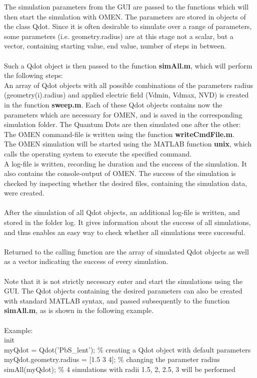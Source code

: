The simulation parameters from the GUI are passed to the functions which will then start the simulation with OMEN.
The parameters are stored in objects of the class Qdot. Since it is often desirable to simulate over a range of parameters, some parameters (i.e. geometry.radius) are at this stage not a scalar, but a vector, containing starting value, end value, number of steps in between.
\\\\
Such a Qdot object is then passed to the function \textbf{simAll.m}, which will perform the following steps:\\
An array of Qdot objects with all possible combinations of the parameters radius  (geometry(i).radius) and applied electric field (Vdmin, Vdmax, NVD) is created in the function \textbf{sweep.m}. Each of these Qdot objects contains now the parameters which are necessary for OMEN, and is saved in the corresponding simulation folder.
The Quantum Dots are then simulated one after the other: \\
The OMEN command-file is written using the function \textbf{writeCmdFile.m}.\\
The OMEN simulation will be started using the MATLAB function \textbf{unix}, which calls the operating system to execute the specified command.\\
A log-file is written, recording he duration and the success of the simulation. It also contains the console-output of OMEN. The success of the simulation is checked by inspecting whether the desired files, containing the simulation data, were created.
\\\\
After the simulation of all Qdot objects, an additional log-file is written, and stored in the folder log. It gives information about the success of all simulations, and thus enables an easy way to check whether all simulations were successful.
\\\\
Returned to the calling function are the array of simulated Qdot objects as well as a vector indicating the success of every simulation.
\\\\
Note that it is not strictly necessary enter and start the simulations using the GUI. The Qdot objects containing the desired parameters can also be created with standard MATLAB syntax, and passed subsequently to the function \textbf{simAll.m}, as is shown in the following example.\\
\\
Example: \\
init\\
myQdot = Qdot('PbS\_lent'); \% creating a Qdot object with default parameters \\
myQdot.geometry.radius = [1.5 3 4]; \% changing the parameter radius\\
simAll(myQdot); \% 4 simulations with radii 1.5, 2, 2.5, 3 will be performed\\


